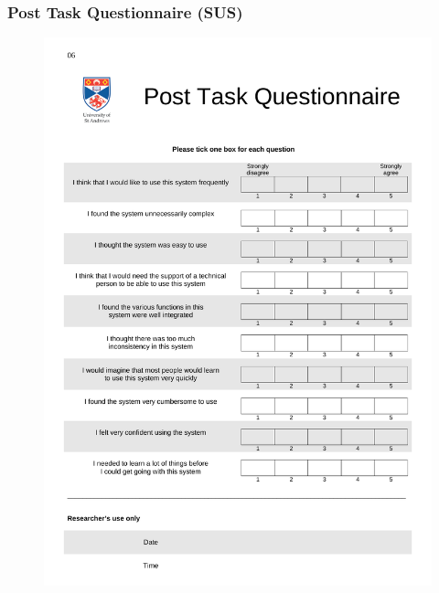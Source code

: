 \subsubsection{Post Task Questionnaire (SUS)}
\label{sus}
\begin{figure}[h]
	\begin{center}
		\includegraphics[width=0.7\linewidth]{PDFs/Post_Task_Questionnaire.pdf}
	\end{center}
\end{figure}

